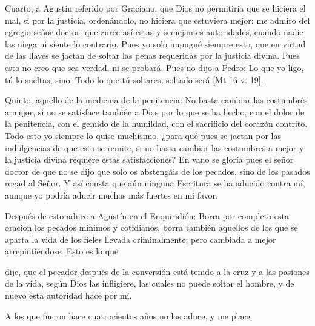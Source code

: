 Cuarto, a Agustín referido por Graciano, que Dios no permitiría que se hiciera el mal, si por la justicia, ordenándolo, no hiciera que estuviera mejor: me admiro del egregio señor doctor, que zurce así estas y semejantes autoridades, cuando nadie las niega ni siente lo contrario. Pues yo solo impugné siempre esto, que en virtud de las llaves se jactan de soltar las penas requeridas por la justicia divina. Pues esto no creo que sea verdad, ni se probará. Pues no dijo a Pedro: Lo que yo ligo, tú lo sueltas, sino: Todo lo que tú soltares, soltado será [Mt 16 v. 19].

Quinto, aquello de la medicina de la penitencia: No basta cambiar las costumbres a mejor, si no se satisface también a Dios por lo que se ha hecho, con el dolor de la penitencia, con el gemido de la humildad, con el sacrificio del corazón contrito. Todo esto yo siempre lo quise muchísimo, ¿para qué pues se jactan por las indulgencias de que esto se remite, si no basta cambiar las costumbres a mejor y la justicia divina requiere estas satisfacciones? En vano se gloría pues el señor doctor de que no se dijo que solo os abstengáis de los pecados, sino de los pasados rogad al Señor. Y así consta que aún ninguna Escritura se ha aducido contra mí, aunque yo podría aducir muchas más fuertes en mi favor.

Después de esto aduce a Agustín en el Enquiridión: Borra por completo esta oración los pecados mínimos y cotidianos, borra también aquellos de los que se aparta la vida de los fieles llevada criminalmente, pero cambiada a mejor arrepintiéndose. Esto es lo que

dije, que el pecador después de la conversión está tenido a la cruz y a las pasiones de la vida, según Dios las infligiere, las cuales no puede soltar el hombre, y de nuevo esta autoridad hace por mí.

A los que fueron hace cuatrocientos años no los aduce, y me place.


